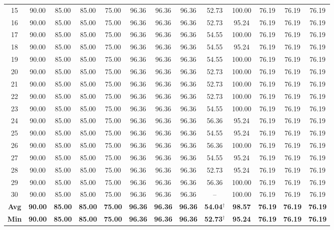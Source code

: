 \begin{table}
{\begin{tabular}{|c|cccc|cccc|cccc|}
15 & 90.00 & 85.00 & 85.00 & 75.00 & 96.36 & 96.36 & 96.36 & 52.73 & 100.00 & 76.19 & 76.19 & 76.19 \\
16 & 90.00 & 85.00 & 85.00 & 75.00 & 96.36 & 96.36 & 96.36 & 52.73 & 95.24 & 76.19 & 76.19 & 76.19 \\
17 & 90.00 & 85.00 & 85.00 & 75.00 & 96.36 & 96.36 & 96.36 & 54.55 & 100.00 & 76.19 & 76.19 & 76.19 \\
18 & 90.00 & 85.00 & 85.00 & 75.00 & 96.36 & 96.36 & 96.36 & 54.55 & 95.24 & 76.19 & 76.19 & 76.19 \\
19 & 90.00 & 85.00 & 85.00 & 75.00 & 96.36 & 96.36 & 96.36 & 54.55 & 100.00 & 76.19 & 76.19 & 76.19 \\
20 & 90.00 & 85.00 & 85.00 & 75.00 & 96.36 & 96.36 & 96.36 & 52.73 & 100.00 & 76.19 & 76.19 & 76.19 \\
21 & 90.00 & 85.00 & 85.00 & 75.00 & 96.36 & 96.36 & 96.36 & 52.73 & 100.00 & 76.19 & 76.19 & 76.19 \\
22 & 90.00 & 85.00 & 85.00 & 75.00 & 96.36 & 96.36 & 96.36 & 52.73 & 100.00 & 76.19 & 76.19 & 76.19 \\
23 & 90.00 & 85.00 & 85.00 & 75.00 & 96.36 & 96.36 & 96.36 & 54.55 & 100.00 & 76.19 & 76.19 & 76.19 \\
24 & 90.00 & 85.00 & 85.00 & 75.00 & 96.36 & 96.36 & 96.36 & 56.36 & 95.24 & 76.19 & 76.19 & 76.19 \\
25 & 90.00 & 85.00 & 85.00 & 75.00 & 96.36 & 96.36 & 96.36 & 54.55 & 95.24 & 76.19 & 76.19 & 76.19 \\
26 & 90.00 & 85.00 & 85.00 & 75.00 & 96.36 & 96.36 & 96.36 & 56.36 & 100.00 & 76.19 & 76.19 & 76.19 \\
27 & 90.00 & 85.00 & 85.00 & 75.00 & 96.36 & 96.36 & 96.36 & 54.55 & 95.24 & 76.19 & 76.19 & 76.19 \\
28 & 90.00 & 85.00 & 85.00 & 75.00 & 96.36 & 96.36 & 96.36 & 52.73 & 95.24 & 76.19 & 76.19 & 76.19 \\
29 & 90.00 & 85.00 & 85.00 & 75.00 & 96.36 & 96.36 & 96.36 & 56.36 & 100.00 & 76.19 & 76.19 & 76.19 \\
30 & 90.00 & 85.00 & 85.00 & 75.00 & 96.36 & 96.36 & 96.36 & -- & 100.00 & 76.19 & 76.19 & 76.19 \\
\hline
\textbf{Avg} & \textbf{90.00} & \textbf{85.00} & \textbf{85.00} & \textbf{75.00} & \textbf{96.36} & \textbf{96.36} & \textbf{96.36} & \textbf{54.04}$^{\dagger}$ & \textbf{98.57} & \textbf{76.19} & \textbf{76.19} & \textbf{76.19} \\
\textbf{Min} & \textbf{90.00} & \textbf{85.00} & \textbf{85.00} & \textbf{75.00} & \textbf{96.36} & \textbf{96.36} & \textbf{96.36} & \textbf{52.73}$^{\dagger}$ & \textbf{95.24} & \textbf{76.19} & \textbf{76.19} & \textbf{76.19} \\

\end{tabular}}
\end{table}
